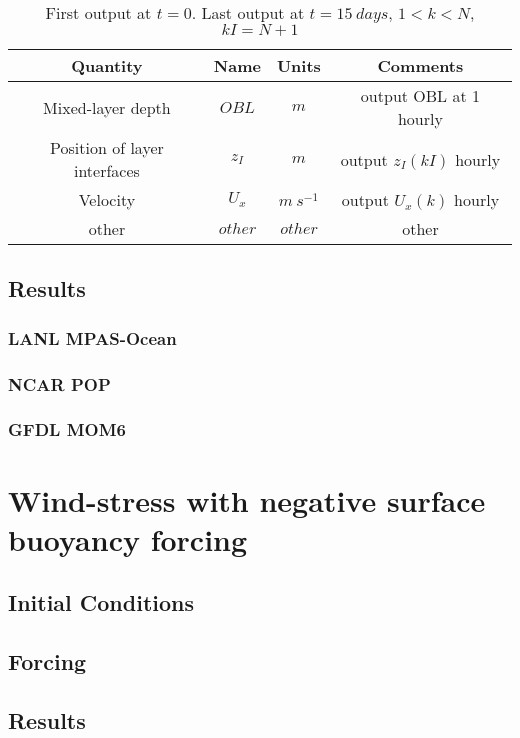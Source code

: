 \documentclass[fleqn, 12pt]{report}
\begin{document}
\begin{table}[htdp]
\caption{First output at $t=0$. Last output at $t=15 \ days$, $1<k<N$, $kI=N+1$}
\begin{center}
\begin{tabular}{c c c c}
\hline
Quantity & Name & Units & Comments \\
\hline
Mixed-layer depth & $OBL$ & $m$ & output OBL at 1 hourly \\
Position of layer interfaces & $z_I$ & $m$ & output $z_I(kI)$ hourly\\
Velocity & $U_x$ & $m \ s^{-1}$ & output $U_x(k)$ hourly\\
other & $other$ & $other$ & other\\
\hline
\end{tabular}
\end{center}
\label{table:metricsShear}
\end{table}



\section{Results}
\subsection{LANL MPAS-Ocean}
\subsection{NCAR POP}
\subsection{GFDL MOM6}

\chapter{Wind-stress with negative surface buoyancy forcing}

\section{Initial Conditions}

\section{Forcing}

\section{Results}

%
%
\end{document}
